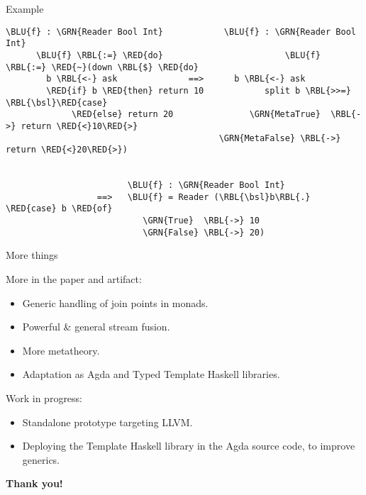 \documentclass[dvipsnames,aspectratio=169]{beamer}
\theoremstyle{remark}
\newcommand{\RED}[1]{{\color{BrickRed} #1}}
\newcommand{\GRN}[1]{{\color{OliveGreen} #1}}
\newcommand{\RBL}[1]{{\color{RoyalBlue} #1}}
\newcommand{\BLU}[1]{{\color{Blue} #1}}
\newcommand{\bsl}{\textbackslash}
\begin{document}
\begin{frame}[fragile]{Example}

\begin{Verbatim}[commandchars=\\\{\}]
      \BLU{f} : \GRN{Reader Bool Int}            \BLU{f} : \GRN{Reader Bool Int}
      \BLU{f} \RBL{:=} \RED{do}                        \BLU{f} \RBL{:=} \RED{~}(down \RBL{$} \RED{do}
        b \RBL{<-} ask              ==>      b \RBL{<-} ask
        \RED{if} b \RED{then} return 10            split b \RBL{>>=} \RBL{\bsl}\RED{case}
             \RED{else} return 20               \GRN{MetaTrue}  \RBL{->} return \RED{<}10\RED{>}
                                          \GRN{MetaFalse} \RBL{->} return \RED{<}20\RED{>})


                        \BLU{f} : \GRN{Reader Bool Int}
                  ==>   \BLU{f} = Reader (\RBL{\bsl}b\RBL{.} \RED{case} b \RED{of}
                           \GRN{True}  \RBL{->} 10
                           \GRN{False} \RBL{->} 20)
\end{Verbatim}


\end{frame}




\begin{frame}{More things}

More in the paper and artifact:
\begin{itemize}
  \item Generic handling of join points in monads.
  \item Powerful \& general stream fusion.
  \item More metatheory.
  \item Adaptation as Agda and Typed Template Haskell libraries.
\end{itemize}
\vspace{1em}

Work in progress:
\begin{itemize}
\item Standalone prototype targeting LLVM.
\item Deploying the Template Haskell library in the Agda source code,
      to improve generics.
\end{itemize}

\begin{center}

  \Large{\textbf{Thank you!}}

\end{center}
\end{frame}
\end{document}
